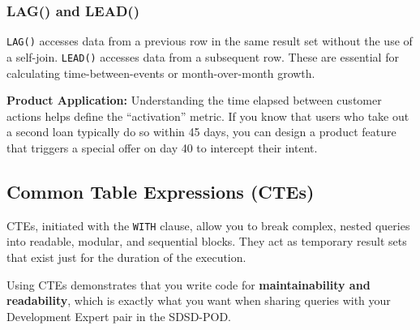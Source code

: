 \subsubsection{LAG() and LEAD()}\label{lag-and-lead}

\texttt{LAG()} accesses data from a previous row in the same result set
without the use of a self-join. \texttt{LEAD()} accesses data from a
subsequent row. These are essential for calculating time-between-events
or month-over-month growth.

\begin{Shaded}
\begin{Highlighting}[]
    \NormalTok{(}  
\OperatorTok{{-}} \NormalTok{(}  
\end{Highlighting}
\end{Shaded}

\textbf{Product Application:} Understanding the time elapsed between
customer actions helps define the ``activation'' metric. If you know
that users who take out a second loan typically do so within 45 days,
you can design a product feature that triggers a special offer on day 40
to intercept their intent.

\subsection{Common Table Expressions
(CTEs)}\label{common-table-expressions-ctes}

CTEs, initiated with the \texttt{WITH} clause, allow you to break
complex, nested queries into readable, modular, and sequential blocks.
They act as temporary result sets that exist just for the duration of
the execution.

Using CTEs demonstrates that you write code for \textbf{maintainability
and readability}, which is exactly what you want when sharing queries
with your Development Expert pair in the SDSD-POD.

